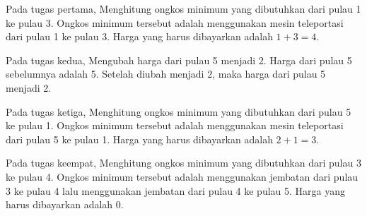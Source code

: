 \documentclass{article}
\begin{document}
Pada tugas pertama, Menghitung ongkos minimum yang dibutuhkan dari pulau 1 ke pulau 3. Ongkos minimum tersebut adalah menggunakan mesin teleportasi dari pulau 1 ke pulau 3. Harga yang harus dibayarkan adalah $1 + 3 = 4$.

Pada tugas kedua, Mengubah harga dari pulau 5 menjadi 2. Harga dari pulau 5 sebelumnya adalah 5. Setelah diubah menjadi 2, maka harga dari pulau 5 menjadi 2.

Pada tugas ketiga, Menghitung ongkos minimum yang dibutuhkan dari pulau 5 ke pulau 1. Ongkos minimum tersebut adalah menggunakan mesin teleportasi dari pulau 5 ke pulau 1. Harga yang harus dibayarkan adalah $2 + 1 = 3$.

Pada tugas keempat, Menghitung ongkos minimum yang dibutuhkan dari pulau 3 ke pulau 4. Ongkos minimum tersebut adalah menggunakan jembatan dari pulau 3 ke pulau 4 lalu menggunakan jembatan dari pulau 4 ke pulau 5. Harga yang harus dibayarkan adalah $0$.
\end{document}
